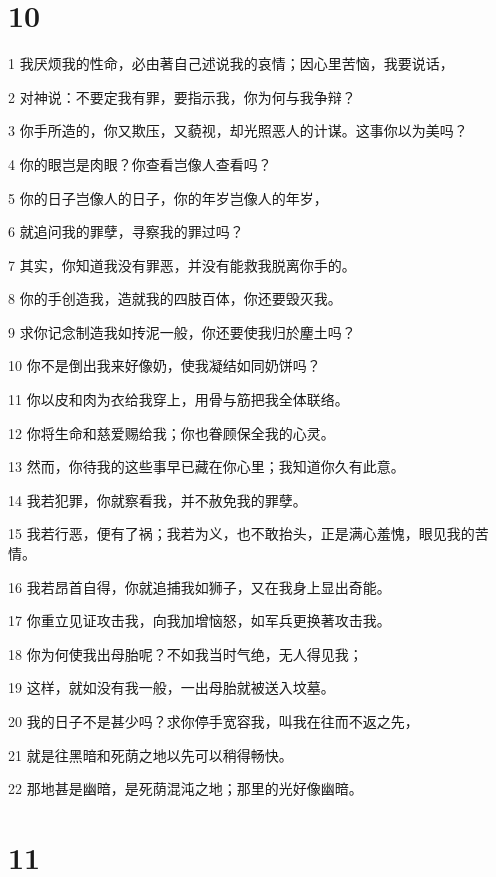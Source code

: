 \chapter{10}

\par 1 我厌烦我的性命，必由著自己述说我的哀情；因心里苦恼，我要说话，
\par 2 对神说：不要定我有罪，要指示我，你为何与我争辩？
\par 3 你手所造的，你又欺压，又藐视，却光照恶人的计谋。这事你以为美吗？
\par 4 你的眼岂是肉眼？你查看岂像人查看吗？
\par 5 你的日子岂像人的日子，你的年岁岂像人的年岁，
\par 6 就追问我的罪孽，寻察我的罪过吗？
\par 7 其实，你知道我没有罪恶，并没有能救我脱离你手的。
\par 8 你的手创造我，造就我的四肢百体，你还要毁灭我。
\par 9 求你记念制造我如抟泥一般，你还要使我归於麈土吗？
\par 10 你不是倒出我来好像奶，使我凝结如同奶饼吗？
\par 11 你以皮和肉为衣给我穿上，用骨与筋把我全体联络。
\par 12 你将生命和慈爱赐给我；你也眷顾保全我的心灵。
\par 13 然而，你待我的这些事早已藏在你心里；我知道你久有此意。
\par 14 我若犯罪，你就察看我，并不赦免我的罪孽。
\par 15 我若行恶，便有了祸；我若为义，也不敢抬头，正是满心羞愧，眼见我的苦情。
\par 16 我若昂首自得，你就追捕我如狮子，又在我身上显出奇能。
\par 17 你重立见证攻击我，向我加增恼怒，如军兵更换著攻击我。
\par 18 你为何使我出母胎呢？不如我当时气绝，无人得见我；
\par 19 这样，就如没有我一般，一出母胎就被送入坟墓。
\par 20 我的日子不是甚少吗？求你停手宽容我，叫我在往而不返之先，
\par 21 就是往黑暗和死荫之地以先可以稍得畅快。
\par 22 那地甚是幽暗，是死荫混沌之地；那里的光好像幽暗。

\chapter{11}

